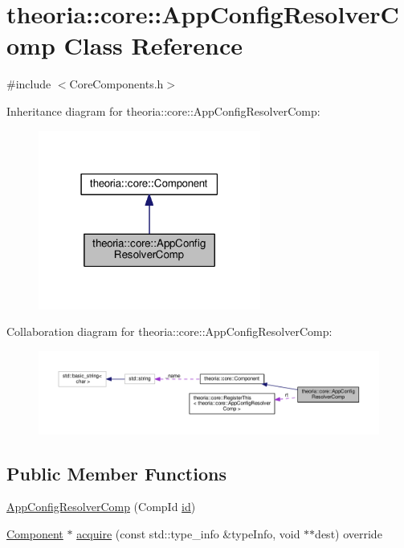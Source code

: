 \hypertarget{classtheoria_1_1core_1_1AppConfigResolverComp}{}\section{theoria\+:\+:core\+:\+:App\+Config\+Resolver\+Comp Class Reference}
\label{classtheoria_1_1core_1_1AppConfigResolverComp}


{\ttfamily \#include $<$Core\+Components.\+h$>$}



Inheritance diagram for theoria\+:\+:core\+:\+:App\+Config\+Resolver\+Comp\+:\nopagebreak
\begin{figure}[H]
\begin{center}
\leavevmode
\includegraphics[width=207pt]{classtheoria_1_1core_1_1AppConfigResolverComp__inherit__graph}
\end{center}
\end{figure}


Collaboration diagram for theoria\+:\+:core\+:\+:App\+Config\+Resolver\+Comp\+:\nopagebreak
\begin{figure}[H]
\begin{center}
\leavevmode
\includegraphics[width=350pt]{classtheoria_1_1core_1_1AppConfigResolverComp__coll__graph}
\end{center}
\end{figure}
\subsection*{Public Member Functions}
\begin{DoxyCompactItemize}
\item 
\hyperlink{classtheoria_1_1core_1_1AppConfigResolverComp_a49f449b95efaa632d5398b161b28144e}{App\+Config\+Resolver\+Comp} (Comp\+Id \hyperlink{classtheoria_1_1core_1_1Component_ab539df9f996efceda7743fa1b69cd25d}{id})
\item 
\hyperlink{classtheoria_1_1core_1_1Component}{Component} $\ast$ \hyperlink{classtheoria_1_1core_1_1AppConfigResolverComp_af04af67f66e3bfea44ab76c33d64a51e}{acquire} (const std\+::type\+\_\+info \&type\+Info, void $\ast$$\ast$dest) override
\end{DoxyCompactItemize}
